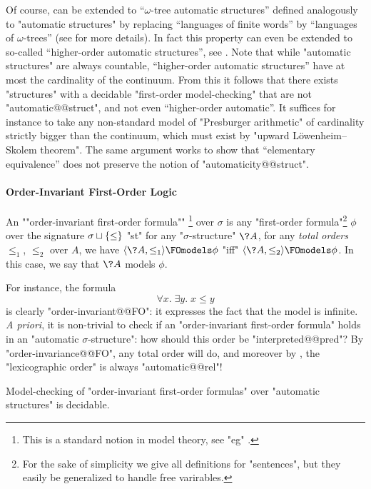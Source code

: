 Of course,  can be extended
to ``$\omega$-tree automatic structures'' defined analogously to "automatic structures" by
replacing ``languages of finite words'' by ``languages of $\omega$-trees''
(see \cite[\S~XII]{Blumensath2024MSOModelTheory} for more details).
In fact this property can even be extended to so-called
``higher-order automatic structures'', see
\cite[last remark of \S~XII.2]{Blumensath2024MSOModelTheory}.
Note that while "automatic structures" are always countable,
``higher-order automatic structures'' have at most the cardinality of the continuum.%
From this it follows that there exists "structures" with a decidable "first-order model-checking" that are not "automatic@@struct", and not even ``higher-order automatic''.
It suffices for instance to take any non-standard model of "Presburger arithmetic"
of cardinality strictly bigger than the continuum, which must exist by
"upward Löwenheim–Skolem theorem". The same argument works to show that ``elementary equivalence''
does not preserve the notion of "automaticity@@struct".

\paragraph*{Order-Invariant First-Order Logic}
An \AP""order-invariant first-order formula""%
\footnote{This is a standard notion in model theory, see "eg"
\cite[Exercise~3.1.12]{Gradel2007FiniteModelTheory}.}
over $\sigma$
is any "first-order formula"\footnote{For the sake of simplicity we give all definitions
for "sentences", but they easily be generalized to handle free varirables.} $\phi$
over the signature $\sigma \sqcup \{\leq\}$ "st" for any
"$\sigma$-structure" $\?A$, for any \emph{total orders} $\leq_1$, $\leq_2$ over $A$,
we have $\tup{\?A, \leq_1} \FOmodels \phi$ "iff" $\tup{\?A, \leq_2} \FOmodels \phi$.
In this case, we say that $\?A$ models $\phi$.

For instance, the formula
\[
	\forall x.\; \exists y.\; x \leq y
\]
is clearly "order-invariant@@FO": it expresses the fact that the model is infinite.
\emph{A priori}, it is non-trivial to check if an "order-invariant first-order formula" holds in an
"automatic $\sigma$-structure": how should this order be "interpreted@@pred"?
By "order-invariance@@FO", any total order will do, and moreover by
, the "lexicographic order" is always "automatic@@rel"!

\begin{proposition}
	\label{prop:order-invariance}
	Model-checking of "order-invariant first-order formulas" over "automatic structures"
	is decidable.
\end{proposition}

